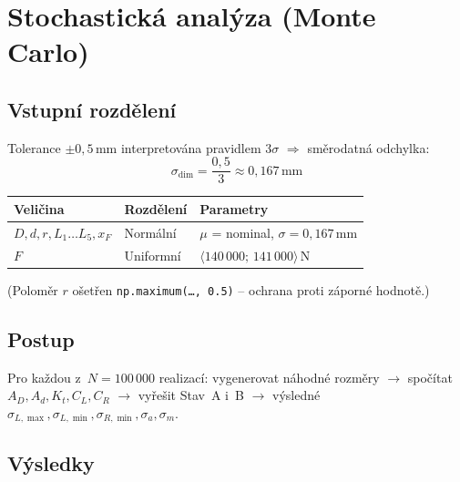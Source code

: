 \documentclass[a4paper,11pt]{article}
\newcommand{\unit}[1]{\,\mathrm{#1}}
\begin{document}
\section{Stochastická analýza (Monte Carlo)}

\subsection{Vstupní rozdělení}

Tolerance $\pm 0{,}5\unit{mm}$ interpretována pravidlem $3\sigma$ $\Rightarrow$ směrodatná odchylka:
\begin{equation}
\sigma_{\mathrm{dim}} = \frac{0{,}5}{3} \approx 0{,}167\unit{mm}
\end{equation}

\begin{table}[H]
\centering
\begin{tabular}{llp{5cm}}
\toprule
\textbf{Veličina} & \textbf{Rozdělení} & \textbf{Parametry} \\
\midrule
$D, d, r, L_1\ldots L_5, x_F$ & Normální   & $\mu$ = nominal, $\sigma = 0{,}167\unit{mm}$ \\
$F$                            & Uniformní  & $\langle 140\,000;\,141\,000\rangle\unit{N}$ \\
\bottomrule
\end{tabular}
\end{table}

(Poloměr $r$ ošetřen \texttt{np.maximum(\ldots, 0.5)} -- ochrana proti záporné hodnotě.)

\subsection{Postup}

Pro každou z~$N = 100\,000$ realizací: vygenerovat náhodné rozměry $\to$ spočítat $A_D, A_d, K_t, C_L, C_R$ $\to$ vyřešit Stav~A i~B $\to$ výsledné $\sigma_{L,\max}, \sigma_{L,\min}, \sigma_{R,\min}, \sigma_a, \sigma_m$.

\subsection{Výsledky}
\end{document}
